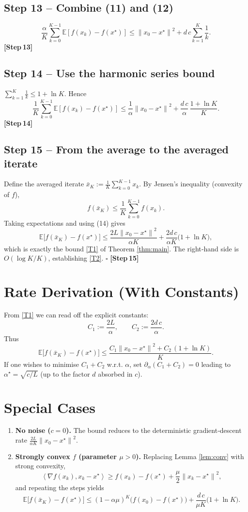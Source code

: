 \documentclass{article}
\newcommand{\E}{\mathbb{E}}
\newcommand{\norm}[1]{\left\lVert #1\right\rVert}
\newcommand{\ip}[2]{\left\langle #1,#2\right\rangle}
\begin{document}
\subsection*{Step 13 – Combine (11) and (12)}
\[
\frac{\alpha}{K}\sum_{k=0}^{K-1}\E\!\left[f(x_k)-f(x^\star)\right]
\le \norm{x_0-x^\star}^{2}+d\,c\sum_{k=1}^{K}\frac{1}{k}.
\tag{13}
\]
\textbf{[Step 13]}

\subsection*{Step 14 – Use the harmonic series bound}
$\displaystyle\sum_{k=1}^{K}\frac{1}{k}\le 1+\ln K$. Hence
\[
\frac{1}{K}\sum_{k=0}^{K-1}\E\!\left[f(x_k)-f(x^\star)\right]
\le \frac{1}{\alpha}\norm{x_0-x^\star}^{2}
+\frac{d\,c}{\alpha}\,\frac{1+\ln K}{K}.
\tag{14}
\]
\textbf{[Step 14]}

\subsection*{Step 15 – From the average to the averaged iterate}
Define the averaged iterate $\bar x_K:=\frac{1}{K}\sum_{k=0}^{K-1}x_k$.
By Jensen’s inequality (convexity of $f$),
\[
f(\bar x_K)\le\frac{1}{K}\sum_{k=0}^{K-1}f(x_k).
\]
Taking expectations and using (14) gives
\[
\E\!\bigl[f(\bar x_K)-f(x^\star)\bigr]
\le \frac{2L\norm{x_0-x^\star}^{2}}{\alpha K}
+\frac{2d\,c}{\alpha K}\bigl(1+\ln K\bigr),
\tag{15}
\]
which is exactly the bound \eqref{T1} of Theorem \ref{thm:main}.  The right‑hand side is $O(\log K/K)$, establishing \eqref{T2}.  $\square$
\textbf{[Step 15]}

\section*{Rate Derivation (With Constants)}
From \eqref{T1} we can read off the explicit constants:
\[
C_1:=\frac{2L}{\alpha},\qquad C_2:=\frac{2d\,c}{\alpha}.
\]
Thus
\[
\E\!\bigl[f(\bar x_K)-f(x^\star)\bigr]\le
\frac{C_1\norm{x_0-x^\star}^{2}+C_2\,(1+\ln K)}{K}.
\]
If one wishes to minimise $C_1+C_2$ w.r.t. $\alpha$, set $\partial_\alpha(C_1+C_2)=0$ leading to $\alpha^\star=\sqrt{c/L}$ (up to the factor $d$ absorbed in $c$).

\section*{Special Cases}
\begin{enumerate}
\item \textbf{No noise ($c=0$).} The bound reduces to the deterministic gradient‑descent rate $\frac{2L}{\alpha K}\norm{x_0-x^\star}^{2}$.
\item \textbf{Strongly convex $f$ (parameter $\mu>0$).} Replacing Lemma \ref{lem:conv} with strong convexity,
\[
\ip{\nabla f(x_k)}{x_k-x^\star}\ge f(x_k)-f(x^\star)+\frac{\mu}{2}\norm{x_k-x^\star}^{2},
\]
and repeating the steps yields
\[
\E\!\bigl[f(\bar x_K)-f(x^\star)\bigr]\le
(1-\alpha\mu)^{K}\bigl(f(x_0)-f(x^\star)\bigr)
+\frac{d\,c}{\mu K}\bigl(1+\ln K\bigr).
\]
\end{enumerate}
\end{document}

